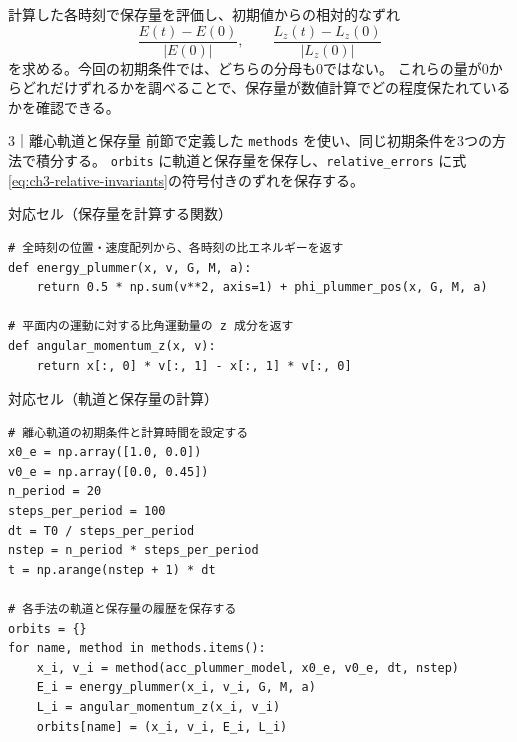 計算した各時刻で保存量を評価し、初期値からの相対的なずれ
\begin{equation}
 \frac{E(t)-E(0)}{|E(0)|},\qquad
 \frac{L_z(t)-L_z(0)}{|L_z(0)|}
\label{eq:ch3-relative-invariants}
\end{equation}
を求める。今回の初期条件では、どちらの分母も0ではない。
これらの量が0からどれだけずれるかを調べることで、保存量が数値計算でどの程度保たれているかを確認できる。
\begin{notebookblock}{3｜離心軌道と保存量}
前節で定義した \texttt{methods} を使い、同じ初期条件を3つの方法で積分する。
\texttt{orbits} に軌道と保存量を保存し、\texttt{relative\_errors} に式\eqref{eq:ch3-relative-invariants}の符号付きのずれを保存する。

\par\smallskip\noindent\begin{minipage}{\linewidth}
{\sffamily\small\color{graytext}対応セル（保存量を計算する関数）}
\begin{Verbatim}[xleftmargin=2mm,fontsize=\small,frame=single,framesep=1.8mm,framerule=0.35pt,rulecolor=\color{listingframe},fillcolor=\color{listingbg}]
# 全時刻の位置・速度配列から、各時刻の比エネルギーを返す
def energy_plummer(x, v, G, M, a):
    return 0.5 * np.sum(v**2, axis=1) + phi_plummer_pos(x, G, M, a)

# 平面内の運動に対する比角運動量の z 成分を返す
def angular_momentum_z(x, v):
    return x[:, 0] * v[:, 1] - x[:, 1] * v[:, 0]
\end{Verbatim}
\end{minipage}

\par\smallskip\noindent\begin{minipage}{\linewidth}
{\sffamily\small\color{graytext}対応セル（軌道と保存量の計算）}
\begin{Verbatim}[xleftmargin=2mm,fontsize=\small,frame=single,framesep=1.8mm,framerule=0.35pt,rulecolor=\color{listingframe},fillcolor=\color{listingbg}]
# 離心軌道の初期条件と計算時間を設定する
x0_e = np.array([1.0, 0.0])
v0_e = np.array([0.0, 0.45])
n_period = 20
steps_per_period = 100
dt = T0 / steps_per_period
nstep = n_period * steps_per_period
t = np.arange(nstep + 1) * dt

# 各手法の軌道と保存量の履歴を保存する
orbits = {}
for name, method in methods.items():
    x_i, v_i = method(acc_plummer_model, x0_e, v0_e, dt, nstep)
    E_i = energy_plummer(x_i, v_i, G, M, a)
    L_i = angular_momentum_z(x_i, v_i)
    orbits[name] = (x_i, v_i, E_i, L_i)
\end{Verbatim}
\end{minipage}


\end{notebookblock}
